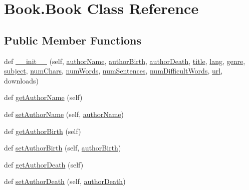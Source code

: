 \hypertarget{class_book_1_1_book}{}\section{Book.\+Book Class Reference}
\label{class_book_1_1_book}
\subsection*{Public Member Functions}
\begin{DoxyCompactItemize}
\item 
def \hyperlink{class_book_1_1_book_a636c49cc5d000c29413a407452d32816}{\+\_\+\+\_\+init\+\_\+\+\_\+} (self, \hyperlink{class_book_1_1_book_a89a361c254d917406ee551760572ff19}{author\+Name}, \hyperlink{class_book_1_1_book_a969f0a0875741882763cb5d801277ebe}{author\+Birth}, \hyperlink{class_book_1_1_book_a4cca4f7acae85aef123dab48548d3b69}{author\+Death}, \hyperlink{class_book_1_1_book_aae1eab64f0e054709c003a270e86a202}{title}, \hyperlink{class_book_1_1_book_a00802108d115f37bf17f6fc5170022e9}{lang}, \hyperlink{class_book_1_1_book_a9e831408f7aa45b9cf66b10613cfaf31}{genre}, \hyperlink{class_book_1_1_book_a84be9f573910fda354e34de00fc95a61}{subject}, \hyperlink{class_book_1_1_book_ad3086167cb5f89b8f4de240a00ae64bc}{num\+Chars}, \hyperlink{class_book_1_1_book_accd8ca17020fbb9dc73b7a0b3d9348e2}{num\+Words}, \hyperlink{class_book_1_1_book_a750700b9cc757c9b23ab2c5030731543}{num\+Sentences}, \hyperlink{class_book_1_1_book_a87b247900d6c59f9a7ad179ad4214148}{num\+Difficult\+Words}, \hyperlink{class_book_1_1_book_a365ef43a762948ef862841d4d2f46420}{url}, downloads)
\item 
def \hyperlink{class_book_1_1_book_ab7cc9694c4c3df2f768f943385ac2886}{get\+Author\+Name} (self)
\item 
def \hyperlink{class_book_1_1_book_a7c53e0f893947ccddf6c1b166dd2beb5}{set\+Author\+Name} (self, \hyperlink{class_book_1_1_book_a89a361c254d917406ee551760572ff19}{author\+Name})
\item 
def \hyperlink{class_book_1_1_book_adba9746e2eb95129acabcbf18557a67f}{get\+Author\+Birth} (self)
\item 
def \hyperlink{class_book_1_1_book_a14279c2bd5b0e4e9c5c4bcd49369027a}{set\+Author\+Birth} (self, \hyperlink{class_book_1_1_book_a969f0a0875741882763cb5d801277ebe}{author\+Birth})
\item 
def \hyperlink{class_book_1_1_book_a8e8a1a282b92b869ee849f59ebfb55fd}{get\+Author\+Death} (self)
\item 
def \hyperlink{class_book_1_1_book_aa9ac68023cb24e8bf3bb550e0a52b72b}{set\+Author\+Death} (self, \hyperlink{class_book_1_1_book_a4cca4f7acae85aef123dab48548d3b69}{author\+Death})

\end{DoxyCompactItemize}
